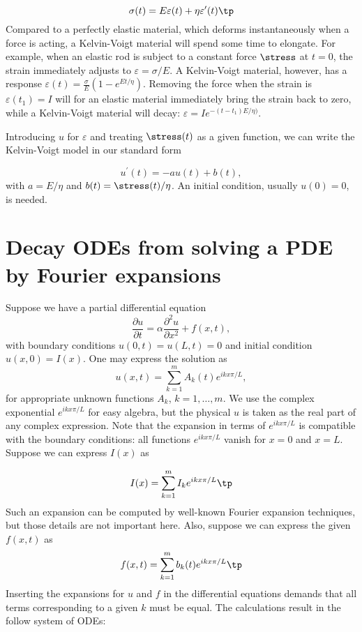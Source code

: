 \documentclass[graybox,sectrefs,envcountresetchap,open=right,final]{svmonodo}
\begin{document}
\begin{equation}
\sigma(t) = E\varepsilon(t) + \eta\varepsilon^{\prime}(t)\tp
\label{decay:app:viscoelasticity:se}
\end{equation}
Compared to a perfectly elastic material, which deforms instantaneously
when a force is acting, a Kelvin-Voigt material will spend some time
to elongate. For example, when an elastic rod is subject to a constant
force $\stress$ at $t=0$, the strain immediately adjusts to $\varepsilon
=\sigma/E$. A Kelvin-Voigt material, however, has a response
$\varepsilon(t) = \frac{\sigma}{E}(1-e^{Et/\eta})$. Removing the force
when the strain is $\varepsilon(t_1) = I$ will for an elastic material
immediately bring the strain back to zero, while a Kelvin-Voigt
material will decay: $\varepsilon = Ie^{-(t-t_1)E/\eta)}$.

Introducing $u$ for $\varepsilon$ and treating $\stress(t)$ as a
given function, we can write the Kelvin-Voigt model in our standard form

\begin{equation}
u^{\prime}(t) = -au(t) + b(t),
\end{equation}
with $a = E/\eta$ and $b(t)=\stress(t)/\eta$. An initial condition,
usually $u(0)=0$, is needed.




\section{Decay ODEs from solving a PDE by Fourier expansions}
\label{decay:app:diffusion:Fourier}


Suppose we have a partial differential equation
\[ \frac{\partial u}{\partial t} = \alpha\frac{\partial^2u}{\partial x^2}
+ f(x,t),
\]
with boundary conditions $u(0,t)=u(L,t)=0$ and initial condition
$u(x,0)=I(x)$. One may express the solution as
\[ u(x,t) = \sum_{k=1}^m A_k(t)e^{ikx\pi/L},\]
for appropriate unknown functions $A_k$, $k=1,\ldots,m$.
We use the complex exponential $e^{ikx\pi/L}$ for easy algebra, but
the physical $u$ is taken as the real part of any complex expression.
Note that the expansion in terms of $e^{ikx\pi/L}$ is compatible with
the boundary conditions: all functions $e^{ikx\pi/L}$ vanish for
$x=0$ and $x=L$. Suppose we can express $I(x)$ as

\[ I(x) = \sum_{k=1}^m I_ke^{ikx\pi/L}
\tp
\]
Such an expansion can be computed by well-known Fourier expansion techniques,
but those details are not important here.
Also, suppose we can express the given $f(x,t)$ as
\[ f(x,t) = \sum_{k=1}^m b_k(t)e^{ikx\pi/L}
\tp
\]
Inserting the expansions for $u$
and $f$ in the differential equations demands that all terms corresponding
to a given $k$ must be equal. The calculations result in the follow
system of ODEs:
\end{document}
